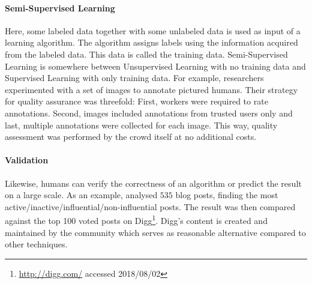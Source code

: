 \paragraph{Semi-Supervised Learning} Here, some labeled data together with some unlabeled data is used as input of a learning
algorithm. The algorithm assigns labels using the information acquired from the labeled data. This data is called the training data. Semi-Supervised Learning is somewhere between Unsupervised Learning with no training data and Supervised Learning with only training data. For example, researchers~\cite{sorokin2008} experimented with a set of images to annotate pictured humans. Their strategy for quality assurance was threefold: First, workers were required to rate annotations. Second, images included annotations from trusted users only and last, multiple annotations were collected for each image. This way, quality assessment was performed by the crowd itself at no additional costs. 

\paragraph{Validation} Likewise, humans can verify the correctness of an algorithm or predict the result on a large scale. As an example, \cite{agarwal2008} analysed $535$ blog posts, finding the most active/inactive/influential/non-influential posts. The result was then compared against the top 100 voted posts on Digg\footnote{\url{http://digg.com/} accessed 2018/08/02}. Digg's content is created and maintained by the community which serves as reasonable alternative compared to other techniques.  
